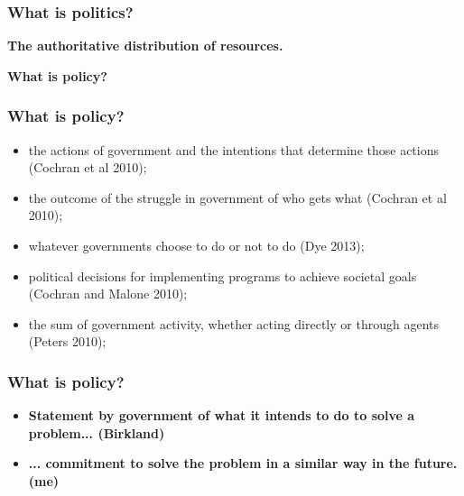 \documentclass[aspectratio=169]{beamer}
\theoremstyle{principle}
\begin{document}
\begin{frame}
\frametitle{What is politics?}
\begin{center}
\Huge\textbf{The authoritative distribution of resources.}
\end{center}
\end{frame}

\begin{frame}
\begin{center}
\Huge\textbf{What is policy?}
\end{center}
\end{frame}

\begin{frame}
\frametitle{What is policy?}

\begin{itemize}
\item the actions of government and the intentions that determine those actions (Cochran et al 2010);
\bigskip
\item the outcome of the struggle in government of who gets what (Cochran et al 2010);
\bigskip
\item whatever governments choose to do or not to do (Dye 2013);
\bigskip
\item political decisions for implementing programs to achieve societal goals (Cochran and Malone 2010);
\bigskip
\item the sum of government activity, whether acting directly or through agents (Peters 2010);
\end{itemize}
\end{frame}

\begin{frame}
\frametitle{What is policy?}
\begin{center}
\begin{itemize}
\item \huge\textbf{Statement by government of what it intends to do to solve a problem... (Birkland)}
\bigskip
\item \huge\textbf{... commitment to solve the problem in a similar way in the future. (me)}
\end{itemize}
\end{center}
\end{frame}

%
\end{document}

